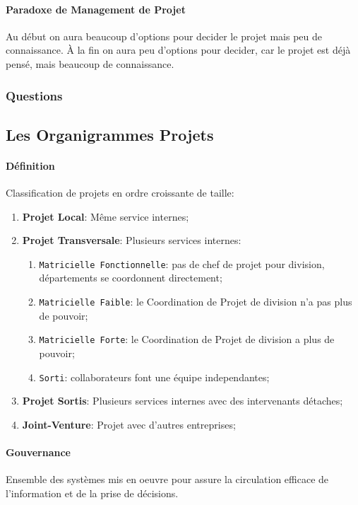 \documentclass{article}
\begin{document}
\paragraph{Paradoxe de Management de Projet}Au début on aura beaucoup d'options pour decider le projet mais peu de connaissance. À la fin on aura peu d'options pour decider, car le projet est déjà pensé, mais beaucoup de connaissance.

\subsubsection{Questions}


\subsection{Les Organigrammes Projets}
\paragraph{Définition}Classification de projets en ordre croissante de taille:
\begin{enumerate}
    \item \textbf{Projet Local}: Même service internes;
    \item \textbf{Projet Transversale}: Plusieurs services internes:
    \begin{enumerate}[noitemsep]
        \item \texttt{Matricielle Fonctionnelle}: pas de chef de projet pour division, départements se coordonnent directement;
        \item \texttt{Matricielle Faible}: le Coordination de Projet de division n'a pas plus de pouvoir;
        \item \texttt{Matricielle Forte}: le Coordination de Projet de division a plus de pouvoir;
        \item \texttt{Sorti}: collaborateurs font une équipe independantes;
    \end{enumerate}
    \item \textbf{Projet Sortis}: Plusieurs services internes avec des intervenants détaches;
    \item \textbf{Joint-Venture}: Projet avec d'autres entreprises; 
\end{enumerate}

\paragraph{Gouvernance}Ensemble des systèmes mis en oeuvre pour assure la circulation efficace de l'information et de la prise de décisions.
\end{document}
